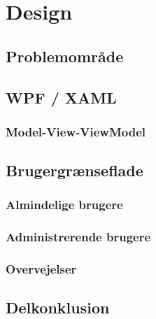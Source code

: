 \chapter{Design}
\label{Design}

\section{Problemområde}

\section{WPF / XAML}
\subsection{Model-View-ViewModel}

\section{Brugergrænseflade}
\subsection{Almindelige brugere}
\subsection{Administrerende brugere}
\subsection{Overvejelser}

\section{Delkonklusion}



